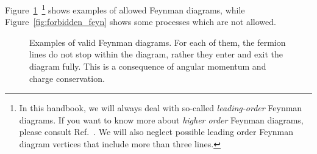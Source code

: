 Figure~\ref{fig:feyn_example}~\footnote{In this handbook, we will always deal with so-called \textit{leading-order} Feynman diagrams. If you want to know more about \textit{higher order} Feynman diagrams, please consult Ref.~\cite{shaw}. We will also neglect possible leading order Feynman diagram vertices that include more than three lines.} shows examples of allowed Feynman diagrams, while Figure~\ref{fig:forbidden_feyn} shows some processes which are not allowed. 

 \begin{figure}[!h]
\begin{center}
\hfill
{}
\hfill
{}
\hfill
{}
\end{center}
\caption{Examples of valid Feynman diagrams. For each of them, the fermion lines do not stop within the diagram, rather they enter and exit the diagram fully. This is a consequence of angular momentum and charge conservation.}
\label{fig:feyn_example}
\end{figure}


